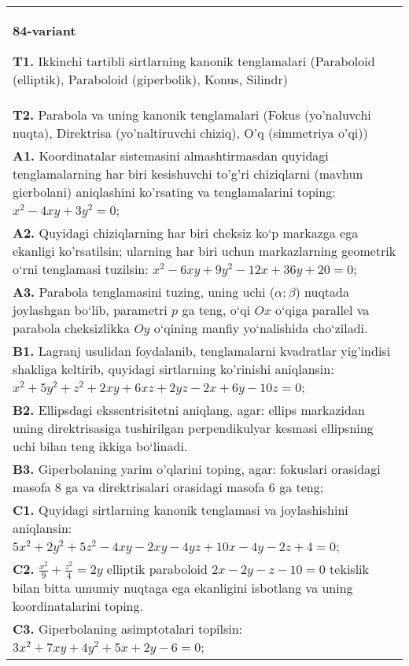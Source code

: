 \documentclass{article}
\begin{document}
\begin{tabular}{m{17cm}}
\textbf{84-variant}
\newline

\textbf{T1.} Ikkinchi tartibli sirtlarning kanonik tenglamalari (Paraboloid (elliptik), Paraboloid (giperbolik), Konus, Silindr) \\
\textbf{T2.} Parabola va uning kanonik tenglamalari (Fokus (yo’naluvchi nuqta), Direktrisa (yo’naltiruvchi chiziq), O’q (simmetriya o’qi)) \\
\textbf{A1.} Koordinatalar sistemasini almashtirmasdan quyidagi tenglamalarning har biri kesishuvchi to'g'ri chiziqlarni (mavhun gierbolani) aniqlashini ko'rsating va tenglamalarini toping: $x^2-4 x y+3 y^2=0$; \\
\textbf{A2.} Quyidagi chiziqlarning har biri cheksiz ko‘p markazga ega ekanligi ko'rsatilsin; ularning har biri uchun markazlarning geometrik o‘rni tenglamasi tuzilsin: $x^2-6 x y+9 y^2-12 x+36 y+20=0$; \\
\textbf{A3.} Parabola tenglamasini tuzing, uning uchi ($\alpha; \beta$) nuqtada joylashgan bo‘lib, parametri $p$ ga teng, o‘qi $Ox$ o‘qiga parallel va parabola cheksizlikka $Oy$ o‘qining manfiy yo‘nalishida cho‘ziladi. \\
\textbf{B1.} Lagranj usulidan foydalanib, tenglamalarni kvadratlar yig'indisi shakliga keltirib, quyidagi sirtlarning ko'rinishi aniqlansin: $x^2+5 y^2+z^2+2 x y+6 x z+2 y z-2 x+6 y-10 z=0$; \\
\textbf{B2.} Ellipsdagi ekssentrisitetni aniqlang, agar: ellips markazidan uning direktrisasiga tushirilgan perpendikulyar kesmasi ellipsning uchi bilan teng ikkiga bo‘linadi. \\
\textbf{B3.} Giperbolaning yarim o'qlarini toping, agar: fokuslari orasidagi masofa 8 ga va direktrisalari orasidagi masofa 6 ga teng; \\
\textbf{C1.} Quyidagi sirtlarning kanonik tenglamasi va joylashishini aniqlansin: $5 x^2+2 y^2+5 z^2-4 x y-2 x y-4 y z+10 x-4 y-2 z+4=0$; \\
\textbf{C2.} $\frac{x^2}{9}+\frac{z^2}{4}=2 y$ elliptik paraboloid $2 x-2 y-z-10=0$ tekislik bilan bitta umumiy nuqtaga ega ekanligini isbotlang va uning koordinatalarini toping. \\
\textbf{C3.} Giperbolaning asimptotalari topilsin: $3 x^2+7 x y+4 y^2+5 x+2 y-6=0$; \\

\end{tabular}
\vspace{1cm}
\end{document}
